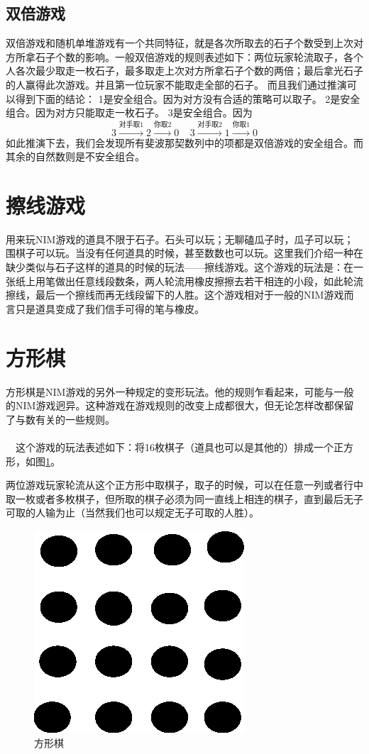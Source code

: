 \documentclass[UTF8,nofonts,cs4size]{ctexrep}
\begin{document}
\subsection{双倍游戏}
双倍游戏和随机单堆游戏有一个共同特征，就是各次所取去的石子个数受到上次对方所拿石子个数的影响。一般双倍游戏的规则表述如下：两位玩家轮流取子，各个人各次最少取走一枚石子，最多取走上次对方所拿石子个数的两倍；最后拿光石子的人赢得此次游戏。并且第一位玩家不能取走全部的石子。
而且我们通过推演可以得到下面的结论：
\newline
[例4]1是安全组合。因为对方没有合适的策略可以取子。
\newline
[例5]2是安全组合。因为对方只能取走一枚石子。
\newline
[例6]3是安全组合。因为
\[3\overset{\mbox{对手取1}}{\longrightarrow}2 \overset{\mbox{你取2}}{\longrightarrow}0 \ \ \ \ \ 3\overset{\mbox{对手取2}}{\longrightarrow}1 \overset{\mbox{你取1}}{\longrightarrow}0\]
如此推演下去，我们会发现所有斐波那契数列中的项都是双倍游戏的安全组合。而其余的自然数则是不安全组合。
\section{擦线游戏}
用来玩NIM游戏的道具不限于石子。石头可以玩；无聊磕瓜子时，瓜子可以玩；围棋子可以玩。当没有任何道具的时候，甚至数数也可以玩。这里我们介绍一种在缺少类似与石子这样的道具的时候的玩法——擦线游戏。这个游戏的玩法是：在一张纸上用笔做出任意线段数条，两人轮流用橡皮擦擦去若干相连的小段，如此轮流擦线，最后一个擦线而再无线段留下的人胜。这个游戏相对于一般的NIM游戏而言只是道具变成了我们信手可得的笔与橡皮。
\section{方形棋}
方形棋是NIM游戏的另外一种规定的变形玩法。他的规则乍看起来，可能与一般的NIM游戏迥异。这种游戏在游戏规则的改变上成都很大，但无论怎样改都保留了与数有关的一些规则。
\paragraph{}
\indent \ \ 
这个游戏的玩法表述如下：将16枚棋子（道具也可以是其他的）排成一个正方形，如图\ref{square}。

两位游戏玩家轮流从这个正方形中取棋子，取子的时候，可以在任意一列或者行中取一枚或者多枚棋子，但所取的棋子必须为同一直线上相连的棋子，直到最后无子可取的人输为止（当然我们也可以规定无子可取的人胜）。
\begin{figure}[htp]
\centering
\includegraphics[scale=1]{square.eps}
\caption{方形棋}
\label{square}
\end{figure}
\end{document}
